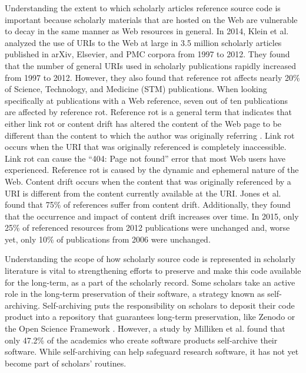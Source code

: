 Understanding the extent to which scholarly articles reference source code is important because scholarly materials that are hosted on the Web are vulnerable to decay in the same manner as Web resources in general. In 2014, Klein et al. \cite{klein-plos2014} analyzed the use of URIs to the Web at large in 3.5 million scholarly articles published in arXiv, Elsevier, and PMC corpora from 1997 to 2012. They found that the number of general URIs used in scholarly publications rapidly increased from 1997 to 2012. However, they also found that reference rot affects nearly 20\% of Science, Technology, and Medicine (STM) publications. When looking specifically at publications with a Web reference, seven out of ten publications are affected by reference rot. Reference rot is a general term that indicates that either link rot or content drift has altered the content of the Web page to be different than the content to which the author was originally referring \cite{vandesompel-icm2014}. Link rot occurs when the URI that was originally referenced is completely inaccessible. Link rot can cause the ``404: Page not found'' error that most Web users have experienced. Reference rot is caused by the dynamic and ephemeral nature of the Web. Content drift occurs when the content that was originally referenced by a URI is different from the content currently available at the URI. Jones et al. \cite{jones-plos2016} found that 75\% of references suffer from content drift. Additionally, they found that the occurrence and impact of content drift increases over time. In 2015, only 25\% of referenced resources from 2012 publications were unchanged and, worse yet, only 10\% of publications from 2006 were unchanged.

Understanding the scope of how scholarly source code is represented in scholarly literature is vital to strengthening efforts to preserve and make this code available for the long-term, as a part of the scholarly record. Some scholars take an active role in the long-term preservation of their software, a strategy known as self-archiving. Self-archiving puts the responsibility on scholars to deposit their code product into a repository that guarantees long-term preservation, like Zenodo \cite{peters_zenodo} or the Open Science Framework \cite{foster_osf}. However, a study by Milliken et al. \cite{iasge_enviro_scan} found that only 47.2\% of the academics who create software products self-archive their software. While self-archiving can help safeguard research software, it has not yet become part of scholars' routines.

